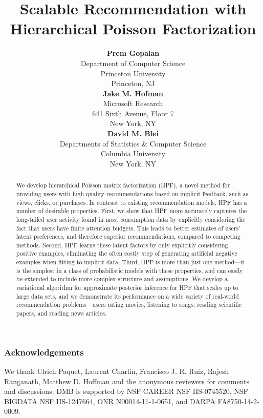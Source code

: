 \documentclass[]{article}
\title{Scalable Recommendation with Hierarchical Poisson
  Factorization}
\author{ {\bf Prem Gopalan} \\
Department of Computer Science \\
Princeton University \\
Princeton, NJ \\
\And
{\bf Jake M. Hofman} \\
Microsoft Research \\
641 Sixth Avenue, Floor 7 \\
New York, NY \\
\And
{\bf David M. Blei} \\
Departments of Statistics \& Computer Science \\
Columbia University \\
New York, NY \\
}
\begin{document}
\maketitle

\begin{abstract}
We develop hierarchical Poisson matrix factorization (HPF), a novel
method for providing users with high quality recommendations based on
implicit feedback, such as views, clicks, or purchases.  In contrast
to existing recommendation models, HPF has a number of desirable
properties.  First, we show that HPF more accurately captures the
long-tailed user activity found in most consumption data by explicitly
considering the fact that users have finite attention budgets.  This
leads to better estimates of users' latent preferences, and therefore
superior recommendations, compared to competing methods.  Second, HPF
learns these latent factors by only explicitly considering positive
examples, eliminating the often costly step of generating artificial
negative examples when fitting to implicit data.  Third, HPF is more
than just one method---it is the simplest in a class of probabilistic
models with these properties, and can easily be extended to include
more complex structure and assumptions.  We develop a variational
algorithm for approximate posterior inference for HPF that scales up
to large data sets, and we demonstrate its performance on a wide
variety of real-world recommendation problems---users rating movies,
listening to songs, reading scientific papers, and reading news
articles.  
\end{abstract}








\subsubsection*{Acknowledgements}
We thank Ulrich Paquet, Laurent Charlin, Francisco J. R. Ruiz, Rajesh
Ranganath, Matthew D. Hoffman and the anonymous reviewers for comments
and discussions. DMB is supported by NSF CAREER NSF IIS-0745520, NSF
BIGDATA NSF IIS-1247664, ONR N00014-11-1-0651, and DARPA
FA8750-14-2-0009.

\small{
  
  
}

\end{document}
